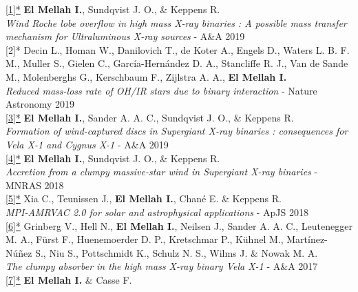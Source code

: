 \begin{flushleft}

\href{http://adsabs.harvard.edu/abs/2018arXiv181012937E}{[1]*} \textbf{El Mellah I.}, Sundqvist J. O., \& Keppens R. \\ 
\emph{Wind Roche lobe overflow in high mass X-ray binaries : A possible mass transfer mechanism for Ultraluminous X-ray sources} - A\&A 2019\\
\vspace*{0.3cm}
[2]* Decin L., Homan W., Danilovich T., de Koter A., Engels D., Waters L. B. F. M., Muller S., Gielen C., Garc\'{i}a-Hern\'{a}ndez D. A., Stancliffe R. J., Van de Sande M., Molenberghs G., Kerschbaum F., Zijlstra A. A., \textbf{El Mellah I.}\\
\emph{Reduced mass-loss rate of OH/IR stars due to binary interaction} - Nature Astronomy 2019\\ 
\vspace*{0.3cm}
\href{http://adsabs.harvard.edu/abs/2018arXiv181012933E}{[3]*} \textbf{El Mellah I.}, Sander A. A. C., Sundqvist J. O., \& Keppens R. \\ 
\emph{Formation of wind-captured discs in Supergiant X-ray binaries : consequences for Vela X-1 and Cygnus X-1} - A\&A 2019\\
\vspace*{0.3cm}
\href{http://adsabs.harvard.edu/abs/2017arXiv171108709E}{[4]*} \textbf{El Mellah I.}, Sundqvist J. O., \& Keppens R. \\ 
\emph{Accretion from a clumpy massive-star wind in Supergiant X-ray binaries} - MNRAS 2018\\
\vspace*{0.3cm}
\href{https://arxiv.org/abs/1710.06140}{[5]*} Xia C., Teunissen J., \textbf{El Mellah I.}, Chan\'e E. \& Keppens R. \\ 
\emph{MPI-AMRVAC 2.0 for solar and astrophysical applications} - ApJS 2018\\
\vspace*{0.3cm}
\href{http://adsabs.harvard.edu/abs/2017arXiv171106743G}{[6]*} Grinberg V., Hell N., \textbf{El Mellah I.}, Neilsen J., Sander A. A. C., Leutenegger M. A., F\"{u}rst F., Huenemoerder D. P., Kretschmar P., K\"{u}hnel M., Mart\'{i}nez-N\'{u}\~{n}ez S., Niu S., Pottschmidt K., Schulz N. S., Wilms J. \& Nowak M. A.\\ 
\emph{The clumpy absorber in the high mass X-ray binary Vela X-1} - A\&A 2017\\
\vspace*{0.3cm}
\href{https://academic.oup.com/mnras/article/467/3/2585/2961795/A-numerical-investigation-of-wind-accretion-in}{[7]*} \textbf{El Mellah I.} \& Casse F. \\ 

\end{flushleft}
